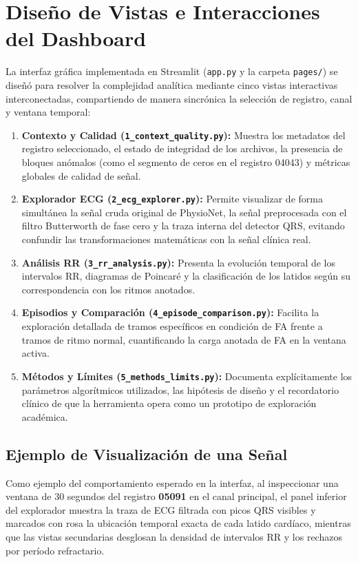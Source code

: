 \documentclass[11pt,a4paper]{article}
\begin{document}
\section{Diseño de Vistas e Interacciones del Dashboard}
La interfaz gráfica implementada en Streamlit (\texttt{app.py} y la carpeta \texttt{pages/}) se diseñó para resolver la complejidad analítica mediante cinco vistas interactivas interconectadas, compartiendo de manera sincrónica la selección de registro, canal y ventana temporal:

\begin{enumerate}
    \item \textbf{Contexto y Calidad (\texttt{1\_context\_quality.py}):} Muestra los metadatos del registro seleccionado, el estado de integridad de los archivos, la presencia de bloques anómalos (como el segmento de ceros en el registro 04043) y métricas globales de calidad de señal.
    \item \textbf{Explorador ECG (\texttt{2\_ecg\_explorer.py}):} Permite visualizar de forma simultánea la señal cruda original de PhysioNet, la señal preprocesada con el filtro Butterworth de fase cero y la traza interna del detector QRS, evitando confundir las transformaciones matemáticas con la señal clínica real.
    \item \textbf{Análisis RR (\texttt{3\_rr\_analysis.py}):} Presenta la evolución temporal de los intervalos RR, diagramas de Poincaré y la clasificación de los latidos según su correspondencia con los ritmos anotados.
    \item \textbf{Episodios y Comparación (\texttt{4\_episode\_comparison.py}):} Facilita la exploración detallada de tramos específicos en condición de FA frente a tramos de ritmo normal, cuantificando la carga anotada de FA en la ventana activa.
    \item \textbf{Métodos y Límites (\texttt{5\_methods\_limits.py}):} Documenta explícitamente los parámetros algorítmicos utilizados, las hipótesis de diseño y el recordatorio clínico de que la herramienta opera como un prototipo de exploración académica.
\end{enumerate}

\subsection{Ejemplo de Visualización de una Señal}
Como ejemplo del comportamiento esperado en la interfaz, al inspeccionar una ventana de 30 segundos del registro \textbf{05091} en el canal principal, el panel inferior del explorador muestra la traza de ECG filtrada con picos QRS visibles y marcados con rosa la ubicación temporal exacta de cada latido cardíaco, mientras que las vistas secundarias desglosan la densidad de intervalos RR y los rechazos por período refractario.
\end{document}
